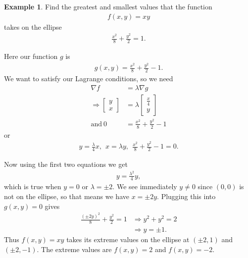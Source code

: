 \documentclass[12pt, letter]{article}
\theoremstyle{plain}
\numberwithin{theorem}{section}
\theoremstyle{definition}
\newtheorem{example}[theorem]{Example}
\begin{document}
\begin{example}
Find the greatest and smallest values that the function
\begin{align*}
f(x,y) = xy
\end{align*}
takes on the ellipse
\begin{align*}
\frac{x^2}{8}+\frac{y^2}{2} = 1.
\end{align*}

\bigskip

Here our function $g$ is
\begin{align*}
g(x,y) = \frac{x^2}{8}+\frac{y^2}{2} - 1.
\end{align*}
We want to satisfy our Lagrange conditions, so we need
\begin{align*}
\nabla f &= \lambda \nabla g \\ 
\Rightarrow \begin{bmatrix} y \\ x \end{bmatrix} &= \lambda \begin{bmatrix} \frac{x}{4} \\ y \end{bmatrix}\\
\text{and} \ 0&= \frac{x^2}{8}+\frac{y^2}{2} - 1
\end{align*}
or
\begin{align*}
y=\frac{\lambda}{4} x, \ \ x=\lambda y, \ \ \frac{x^2}{8}+\frac{y^2}{2} - 1=0.
\end{align*}
\end{example}
Now using the first two equations we get
\begin{align*}
y=\frac{\lambda^2}{4}y,
\end{align*}
which is true when $y=0$ or $\lambda = \pm 2$. We see immediately $y\neq 0$ since $(0,0)$ is not on the ellipse, so that means we have $x=\pm 2y$. Plugging this into $g(x,y)=0$ gives
\begin{align*}
\frac{(\pm 2 y)^2}{8}+\frac{y^2}{2} = 1 &\Rightarrow y^2+y^2=2\\
&\Rightarrow y=\pm 1.
\end{align*}
Thus $f(x,y)=xy$ takes its extreme values on the ellipse at $(\pm 2, 1)$ and $(\pm 2, -1)$. The extreme values are $f(x,y) = 2$ and $f(x,y) = -2$.

\bigskip

\hrulefill

\bigskip
\end{document}
